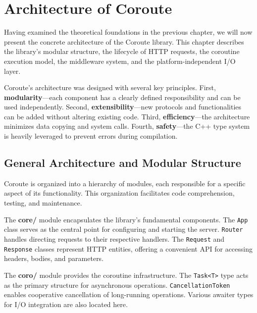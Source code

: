 \section{Architecture of Coroute}
\label{sec:architecture}

Having examined the theoretical foundations in the previous chapter, we will now present the concrete architecture of the Coroute library. This chapter describes the library's modular structure, the lifecycle of HTTP requests, the coroutine execution model, the middleware system, and the platform-independent I/O layer.

Coroute's architecture was designed with several key principles. First, \textbf{modularity}---each component has a clearly defined responsibility and can be used independently. Second, \textbf{extensibility}---new protocols and functionalities can be added without altering existing code. Third, \textbf{efficiency}---the architecture minimizes data copying and system calls. Fourth, \textbf{safety}---the C++ type system is heavily leveraged to prevent errors during compilation.

\subsection{General Architecture and Modular Structure}

Coroute is organized into a hierarchy of modules, each responsible for a specific aspect of its functionality. This organization facilitates code comprehension, testing, and maintenance.

The \textbf{core/} module encapsulates the library's fundamental components. The \texttt{App} class serves as the central point for configuring and starting the server. \texttt{Router} handles directing requests to their respective handlers. The \texttt{Request} and \texttt{Response} classes represent HTTP entities, offering a convenient API for accessing headers, bodies, and parameters.

The \textbf{coro/} module provides the coroutine infrastructure. The \texttt{Task<T>} type acts as the primary structure for asynchronous operations. \texttt{CancellationToken} enables cooperative cancellation of long-running operations. Various awaiter types for I/O integration are also located here.

